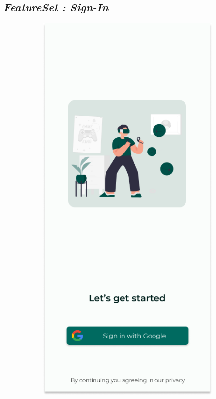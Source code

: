 \subsection{\textit{FeatureSet : Sign-In}}
\begin{figure}[H]
	\centering
	\begin{subfigure}[b]{0.23\textwidth}
		\centering
	  \includegraphics[width=\linewidth]{contents/chapter-3/images/HF-login.png}

\end{subfigure}
\end{figure}
